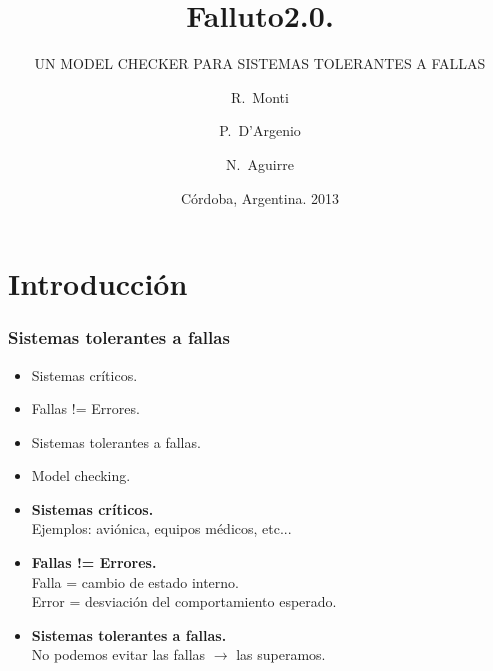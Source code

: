 \documentclass[serif]{beamer}
\title[Falluto2.0] %
{Falluto2.0.}
\subtitle{ UN MODEL CHECKER PARA SISTEMAS TOLERANTES A FALLAS}
\author[Monti] %
{R.~Monti \and P.~D'Argenio \and N.~Aguirre}
\institute[FaMAF - UNC] %
{
Facultad de Matem\'atica, Astronom\'ia y F\'isica, Universidad Nacional de 
Córdoba
}
\date[4-2-2013] %
{Córdoba, Argentina. 2013}
\begin{document}
\frame{\titlepage}


\section[Intro]{Introducción}
\begin{frame}
\frametitle{Sistemas tolerantes a fallas}
\begin{itemize}\itemsep15pt
\item Sistemas críticos.
\item Fallas != Errores.
\item Sistemas tolerantes a fallas.
\item Model checking.
\end{itemize}
\end{frame}


\begin{frame}
\begin{itemize}\itemsep15pt
\item {\Large \bfseries Sistemas críticos.}\\[5pt]
\hspace{0.5cm}Ejemplos: aviónica, equipos médicos, etc...
\item {\Large \bfseries Fallas != Errores.}\\[5pt]
\hspace{0.5cm}Falla = cambio de estado interno.\\
\hspace{0.5cm}Error = desviación del comportamiento esperado.
\item {\Large \bfseries Sistemas tolerantes a fallas.}\\[5pt]
\hspace{0.5cm}No podemos evitar las fallas $\longrightarrow$ las superamos.
\end{itemize}
\end{frame}
\end{document}
